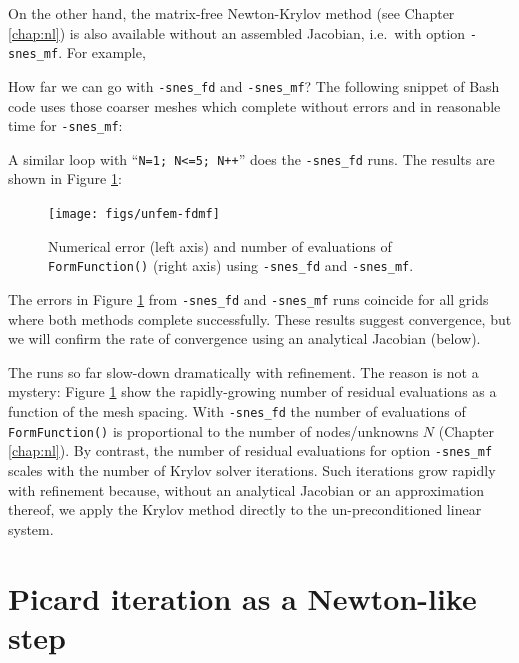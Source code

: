 On the other hand, the matrix-free Newton-Krylov method (see Chapter \ref{chap:nl}) is also available without an assembled Jacobian, i.e.~with option \texttt{-snes\_mf}.  For example, 

How far we can go with \texttt{-snes\_fd} and \texttt{-snes\_mf}?  The following snippet of Bash code uses those coarser meshes which complete without errors and in reasonable time for \texttt{-snes\_mf}:
A similar loop with ``\texttt{N=1; N<=5; N++}'' does the \texttt{-snes\_fd} runs.  The results are shown in Figure \ref{fig:un:unfem-fdmf}:

\begin{figure}
\texttt{[image: figs/unfem-fdmf]}
\caption{Numerical error (left axis) and number of evaluations of \texttt{FormFunction()} (right axis) using \texttt{-snes\_fd} and \texttt{-snes\_mf}.}
\label{fig:un:unfem-fdmf}
\end{figure}

The errors in Figure \ref{fig:un:unfem-fdmf} from \texttt{-snes\_fd} and  \texttt{-snes\_mf} runs coincide for all grids where both methods complete successfully.  These results suggest convergence, but we will confirm the rate of convergence using an analytical Jacobian (below).

The runs so far slow-down dramatically with refinement.  The reason is not a mystery: Figure \ref{fig:un:unfem-fdmf} show the rapidly-growing number of residual evaluations as a function of the mesh spacing.  With \texttt{-snes\_fd} the number of evaluations of \texttt{FormFunction()} is proportional to the number of nodes/unknowns $N$ (Chapter \ref{chap:nl}).  By contrast, the number of residual evaluations for option \texttt{-snes\_mf} scales with the number of Krylov solver iterations.  Such iterations grow rapidly with refinement because, without an analytical Jacobian or an approximation thereof, we apply the Krylov method directly to the un-preconditioned linear system.


\section{Picard iteration as a Newton-like step}

